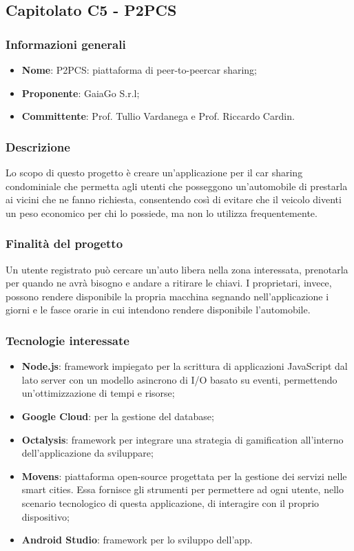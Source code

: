 \subsection{Capitolato C5 - P2PCS}
\subsubsection{Informazioni generali}
\begin{itemize}
\item \textbf{Nome}: P2PCS: piattaforma di peer-to-peer\glosp car sharing;
\item \textbf{Proponente}: GaiaGo S.r.l;
\item \textbf{Committente}: Prof. Tullio Vardanega e Prof. Riccardo Cardin.
\end{itemize}
\subsubsection{Descrizione}
Lo scopo di questo progetto è creare un'applicazione per il car sharing 
condominiale che permetta agli utenti che posseggono un'automobile di prestarla 
ai vicini che ne fanno richiesta, consentendo così di evitare che il veicolo 
diventi un peso economico per chi lo possiede, ma non lo utilizza frequentemente.

\subsubsection{Finalità del progetto}
Un utente registrato può cercare un'auto libera nella zona interessata, 
prenotarla per quando ne avrà bisogno e andare a ritirare le chiavi. I 
proprietari, invece, possono rendere disponibile la propria macchina segnando nell'applicazione i giorni e le fasce orarie in cui intendono rendere disponibile l'automobile.

\subsubsection{Tecnologie interessate}
\begin{itemize}
	\item \textbf{Node.js\glo}: framework\glo{} impiegato per la scrittura di applicazioni 
JavaScript dal lato server con un modello asincrono di I/O basato su eventi, 
permettendo un'ottimizzazione di tempi e risorse;
	\item \textbf{Google Cloud}: per la gestione del database;
	\item \textbf{Octalysis}: framework\glo{} per integrare una strategia di gamification\glo{} all'interno dell'applicazione da sviluppare;
	\item \textbf{Movens}: piattaforma open-source\glo{} progettata per la gestione dei servizi nelle smart cities. Essa fornisce gli strumenti per permettere ad ogni	utente, nello scenario tecnologico di questa applicazione, di interagire con il proprio dispositivo;
	\item \textbf{Android Studio}: framework\glo{} per lo sviluppo dell'app.
\end{itemize}

